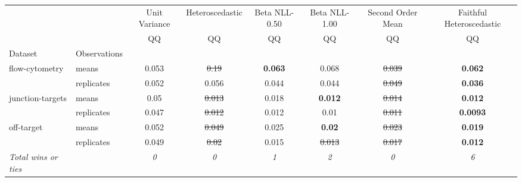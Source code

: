\begin{tabular}{ll|c|c|c|c|c|c}
\toprule
{} & {} & {Unit Variance} & {Heteroscedastic} & {Beta NLL-0.50} & {Beta NLL-1.00} & {Second Order Mean} & {Faithful Heteroscedastic} \\
{} & {} & {QQ} & {QQ} & {QQ} & {QQ} & {QQ} & {QQ} \\
{Dataset} & {Observations} & {} & {} & {} & {} & {} & {} \\
\midrule
\multirow[t]{2}{*}{flow-cytometry} & means & 0.053 & \sout{0.19} & \textbf{0.063} & 0.068 & \sout{0.039} & \textbf{0.062} \\
 & replicates & 0.052 & 0.056 & 0.044 & 0.044 & \sout{0.049} & \textbf{0.036} \\
\multirow[t]{2}{*}{junction-targets} & means & 0.05 & \sout{0.013} & 0.018 & \textbf{0.012} & \sout{0.014} & \textbf{0.012} \\
 & replicates & 0.047 & \sout{0.012} & 0.012 & 0.01 & \sout{0.011} & \textbf{0.0093} \\
\multirow[t]{2}{*}{off-target} & means & 0.052 & \sout{0.049} & 0.025 & \textbf{0.02} & \sout{0.023} & \textbf{0.019} \\
 & replicates & 0.049 & \sout{0.02} & 0.015 & \sout{0.013} & \sout{0.017} & \textbf{0.012} \\
\textit{{Total wins or ties}} &  & \textit{0} & \textit{0} & \textit{1} & \textit{2} & \textit{0} & \textit{6} \\
\bottomrule
\end{tabular}
